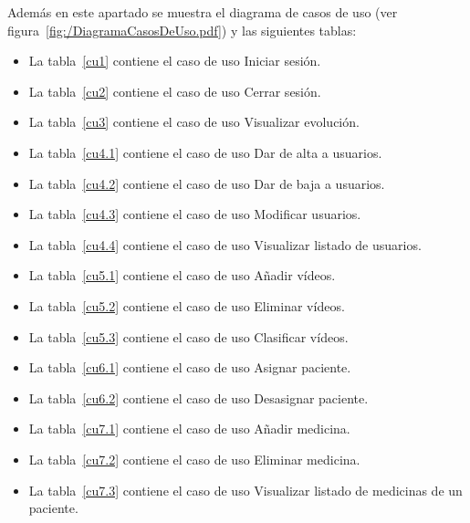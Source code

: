 Además en este apartado se muestra el diagrama de casos de uso (ver figura~\ref{fig:/DiagramaCasosDeUso.pdf}) y las siguientes tablas:
\begin{itemize}
\item La tabla~\ref{cu1} contiene el caso de uso Iniciar sesión.
\item La tabla~\ref{cu2} contiene el caso de uso Cerrar sesión.
\item La tabla~\ref{cu3} contiene el caso de uso Visualizar evolución.
\item La tabla~\ref{cu4.1} contiene el caso de uso Dar de alta a usuarios.
\item La tabla~\ref{cu4.2} contiene el caso de uso Dar de baja a usuarios.
\item La tabla~\ref{cu4.3} contiene el caso de uso Modificar usuarios.
\item La tabla~\ref{cu4.4} contiene el caso de uso Visualizar listado de usuarios.
\item La tabla~\ref{cu5.1} contiene el caso de uso Añadir vídeos.
\item La tabla~\ref{cu5.2} contiene el caso de uso Eliminar vídeos.
\item La tabla~\ref{cu5.3} contiene el caso de uso Clasificar vídeos.
\item La tabla~\ref{cu6.1} contiene el caso de uso Asignar paciente.
\item La tabla~\ref{cu6.2} contiene el caso de uso Desasignar paciente.
\item La tabla~\ref{cu7.1} contiene el caso de uso Añadir medicina.
\item La tabla~\ref{cu7.2} contiene el caso de uso Eliminar medicina.
\item La tabla~\ref{cu7.3} contiene el caso de uso Visualizar listado de medicinas de un paciente.
\end{itemize}



